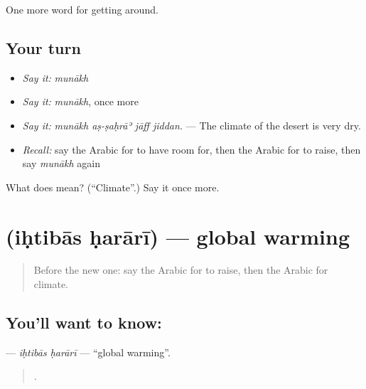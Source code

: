 \begin{grammarlens}[title={What you've built}]
One more word for getting around.
\end{grammarlens}

\subsection*{Your turn}
\begin{itemize}
\raggedright
  \item \emph{Say it:} \emph{munākh}
  \item \emph{Say it:} \emph{munākh}, once more
  \item \emph{Say it:} \emph{munākh aṣ-ṣaḥrāʾ jāff jiddan.} — The climate of the desert is very dry.
  \item \emph{Recall:} say the Arabic for to have room for, then the Arabic for to raise, then say \emph{munākh} again
\end{itemize}

\begin{tcolorbox}[breakable,colback=teal!4,colframe=teal!35!black,title={Before you move on}]
What does  mean? (\textquotedblleft{}Climate\textquotedblright{}.) Say it once more.
\end{tcolorbox}
\section[\texorpdfstring{\ar{احتباس} \ar{حراري} (iḥtibās ḥarārī)}{احتباس حراري (iḥtibās ḥarārī)}]{  (iḥtibās ḥarārī) — global warming}

\label{lesson:AR-C463-ihtibas-harari}



\begin{quote}
Before the new one: say the Arabic for to raise, then the Arabic for climate.
\end{quote}

\subsection*{You'll want to know:  }
\textbf{ } — \emph{iḥtibās ḥarārī} — \textquotedblleft{}global warming\textquotedblright{}.

\begin{quote}
     .
\end{quote}

